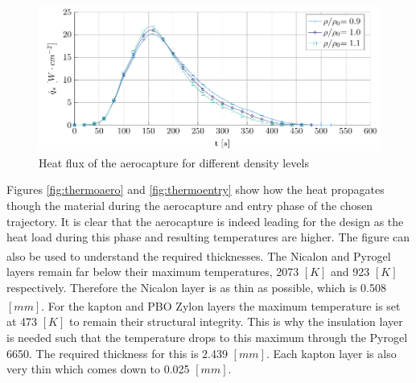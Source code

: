 \begin{figure}[h]
	\centering
	\includegraphics{./Figure/Thermal/heatfluxes.pdf}
	\caption{Heat flux of the aerocapture for different density levels}
	\label{fig:heatfluxes}
\end{figure}

Figures \ref{fig:thermoaero} and \ref{fig:thermoentry} show how the heat propagates though the material during the aerocapture and entry phase of the chosen trajectory. It is clear that the aerocapture is indeed leading for the design as the heat load during this phase and resulting temperatures are higher. The figure can also be used to understand the required thicknesses. The Nicalon and Pyrogel\textsuperscript{\textregistered} layers remain far below their maximum temperatures, 2073 $\left[K\right]$ and 923 $\left[K\right]$ respectively. Therefore the Nicalon layer is as thin as possible, which is 0.508 $\left[mm\right]$. For the kapton and PBO Zylon\textsuperscript{\textregistered} layers the maximum temperature is set at 473 $\left[K\right]$ to remain their structural integrity. This is why the insulation layer is needed such that the temperature drops to this maximum through the Pyrogel 6650. The required thickness for this is 2.439 $\left[mm\right]$. Each kapton layer is also very thin which comes down to 0.025 $\left[mm\right]$.

